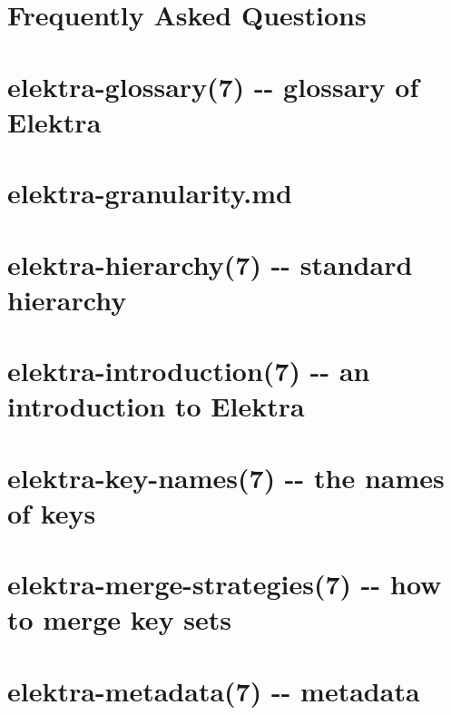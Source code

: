 \documentclass[twoside]{book}
\newcommand{\+}{\discretionary{\mbox{\scriptsize$\hookleftarrow$}}{}{}}
\begin{document}
\chapter{Frequently Asked Questions}
\label{doc_help_elektra-faq_md}

\chapter{elektra-\/glossary(7) -\/-\/ glossary of Elektra}
\label{md_doc_help_elektra-glossary}

\chapter{elektra-\/granularity.md}
\label{doc_help_elektra-granularity_md}

\chapter{elektra-\/hierarchy(7) -\/-\/ standard hierarchy}
\label{md_doc_help_elektra-hierarchy}

\chapter{elektra-\/introduction(7) -\/-\/ an introduction to Elektra}
\label{md_doc_help_elektra-introduction}

\chapter{elektra-\/key-\/names(7) -\/-\/ the names of keys}
\label{md_doc_help_elektra-key-names}

\chapter{elektra-\/merge-\/strategies(7) -\/-\/ how to merge key sets}
\label{md_doc_help_elektra-merge-strategy}

\chapter{elektra-\/metadata(7) -\/-\/ metadata}
\label{md_doc_help_elektra-metadata}

\end{document}
